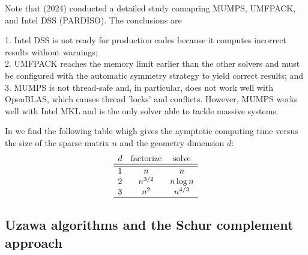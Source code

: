 Note that \textcite{pedr24} (2024) conducted a detailed study comapring 
MUMPS, UMFPACK, and Intel DSS (PARDISO).
The conclusions are 
\begin{displayquote}
{\color{darkgray}
1. Intel DSS is not ready for production codes because it computes incorrect results without warnings;\\
2. UMFPACK reaches the memory limit earlier than the other solvers and must be configured with the automatic
symmetry strategy to yield correct results; and\\
3. MUMPS is not thread-safe and, in particular, does not work well with OpenBLAS, which causes thread 'locks' and
conflicts. However, MUMPS works well with Intel MKL and is the only solver able to tackle massive systems.}
\end{displayquote}
In \textcite{saramito} we find the following table whigh gives the aymptotic computing time versus the 
size of the sparse matrix $n$ and the geometry dimension $d$:
\[
\begin{array}{lcc}
d& \text{factorize} & \text{solve} \\
\hline\hline
1& n & n \\
2& n^{3/2} & n \log n \\
3& n^2 & n^{4/3}\\
\hline
\end{array}
\]

\subsection{Uzawa algorithms and the Schur complement approach }


